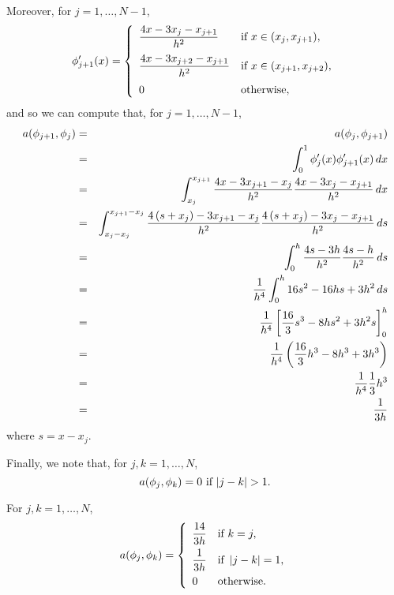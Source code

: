 \begin{solution}
\begin{enumerate}
\begin{enumerate}
Moreover, for $j=1,\ldots,N-1$,
\[
\phi_{j+1}'(x)=\left\{\begin{array}{ll}
\displaystyle{{4x-3x_j-x_{j+1} \over h^2}} & \displaystyle{\mbox{if }x\in(x_j,x_{j+1})},
\\[10pt]
\displaystyle{{4x-3x_{j+2}-x_{j+1} \over h^2}} & \displaystyle{\mbox{if }x\in(x_{j+1},x_{j+2})},
\\[10pt]
0 & \mbox{otherwise},
\end{array}\right.
\]
and so we can compute that, for $j=1,\ldots,N-1$,
\begin{eqnarray*}
a(\phi_{j+1},\phi_j)&=&a(\phi_j,\phi_{j+1})
\\
&=&\int_0^1\phi_j'(x)\phi_{j+1}'(x)\,dx
\\
&=&\int_{x_j}^{x_{j+1}}{4x-3x_{j+1}-x_j \over h^2}{4x-3x_j-x_{j+1} \over h^2}\,dx
\\
&=&\int_{x_j-x_j}^{x_{j+1}-x_j}{4\left(s+x_j\right)-3x_{j+1}-x_j \over h^2}{4\left(s+x_j\right)-3x_j-x_{j+1} \over h^2}\,ds
\\
&=&\int_0^h{4s-3h \over h^2}{4s-h \over h^2}\,ds
\\
&=&{1 \over h^4}\int_0^h16s^2-16hs+3h^2\,ds
\\
&=&{1 \over h^4}\left[{16 \over 3}s^3-8hs^2+3h^2s\right]_0^h
\\
&=&{1 \over h^4}\left({16 \over 3}h^3-8h^3+3h^3\right)
\\
&=&{1 \over h^4}{1 \over 3}h^3
\\
&=&{1 \over 3h}
\end{eqnarray*}
where $s=x-x_j$.

Finally, we note that, for $j,k=1,\ldots,N$,
\[
a\ip{\phi_j,\phi_k}=0\mbox{ if }|j-k|>1.
\]

For $j,k=1,\ldots,N$,
\[
a(\phi_j,\phi_k)=\left\{\begin{array}{ll}\displaystyle{{14 \over 3h}} & \mbox{if }k=j, \\[.75em] \displaystyle{{1 \over 3h}} & \mbox{if }\left|j-k\right|=1, \\[.75em] \displaystyle{0} & \mbox{otherwise}.\end{array}\right.
\]


\end{enumerate}
\end{enumerate}
\end{solution}
